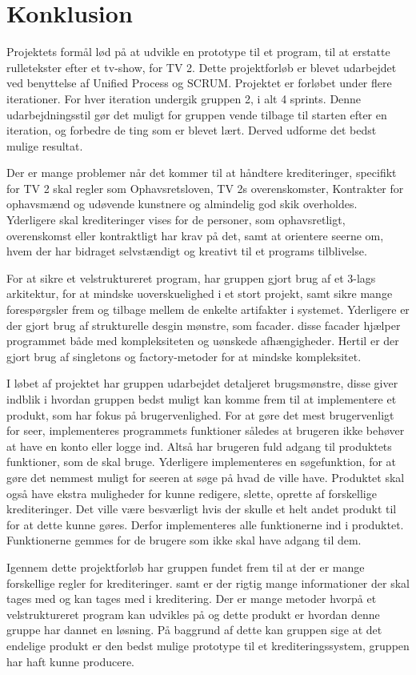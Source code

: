 \newpage
\section{Konklusion}
Projektets formål lød på at udvikle en prototype til et program, til at erstatte rulletekster efter et tv-show, for TV 2.
Dette projektforløb er blevet udarbejdet ved benyttelse af Unified Process og SCRUM. Projektet er forløbet under flere iterationer. For hver iteration undergik gruppen 2, i alt 4 sprints. Denne udarbejdningsstil gør det muligt for gruppen vende tilbage til starten efter en iteration, og forbedre de ting som er blevet lært. Derved udforme det bedst mulige resultat.

Der er mange problemer når det kommer til at håndtere krediteringer, specifikt for TV 2 skal regler som Ophavsretsloven, TV 2s overenskomster, Kontrakter for ophavsmænd og udøvende kunstnere og almindelig god skik overholdes. Yderligere skal krediteringer vises for de personer, som ophavsretligt, overenskomst eller kontraktligt har krav på det, samt at orientere seerne om, hvem der har bidraget selvstændigt og kreativt til et programs tilblivelse.

For at sikre et velstruktureret program, har gruppen gjort brug af et 3-lags arkitektur, for at mindske uoverskuelighed i et stort projekt, samt sikre mange forespørgsler frem og tilbage mellem de enkelte artifakter i systemet. Yderligere er der gjort brug af strukturelle desgin mønstre, som facader. disse facader hjælper programmet både med kompleksiteten og uønskede afhængigheder. Hertil er der gjort brug af singletons og factory-metoder for at mindske kompleksitet.

I løbet af projektet har gruppen udarbejdet detaljeret brugsmønstre, disse giver indblik i hvordan gruppen bedst muligt kan komme frem til at implementere et produkt, som har fokus på brugervenlighed. For at gøre det mest brugervenligt for seer, implementeres programmets funktioner således at brugeren ikke behøver at have en konto eller logge ind. Altså har brugeren fuld adgang til produktets funktioner, som de skal bruge. Yderligere implementeres en søgefunktion, for at gøre det nemmest muligt for seeren at søge på hvad de ville have. Produktet skal også have ekstra muligheder for kunne redigere, slette, oprette af forskellige krediteringer. Det ville være besværligt hvis der skulle et helt andet produkt til for at dette kunne gøres. Derfor implementeres alle funktionerne ind i produktet. Funktionerne gemmes for de brugere som ikke skal have adgang til dem. 

Igennem dette projektforløb har gruppen fundet frem til at der er mange forskellige regler for krediteringer. samt er der rigtig mange informationer der skal tages med og kan tages med i kreditering. Der er mange metoder hvorpå et velstruktureret program kan udvikles på og dette produkt er hvordan denne gruppe har dannet en løsning. 
På baggrund af dette kan gruppen sige at det endelige produkt er den bedst mulige prototype til et krediteringssystem, gruppen har haft kunne producere.